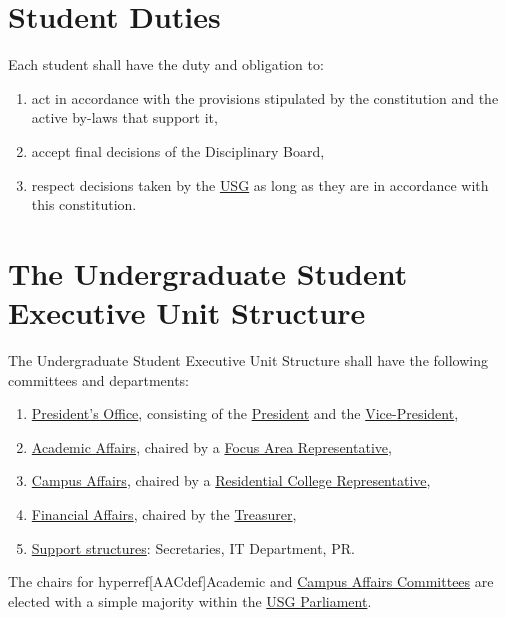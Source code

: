 \documentclass[12pt]{LaTeX_Misc/constitution}
\begin{document}
\section{Student Duties}
Each student shall have the duty and obligation to:
\begin{enumerate}
\item
act in accordance with the provisions stipulated by the constitution and the active by-laws that support it,

\item 
accept final decisions of the Disciplinary Board,

\item
 respect decisions taken by the \hyperref[USGdef]{USG} as long as they are in accordance with this constitution.
\end{enumerate}




\label{USGexecutiveUnitDef}


\section{The Undergraduate Student Executive Unit Structure} 
\label{USGstructure}
The Undergraduate Student Executive Unit Structure shall have the following committees and departments:
\begin{enumerate}
\item \hyperref[PresidentOfficeDef]{President's Office}, consisting of the \hyperref[PresDef]{President} and the \hyperref[VPdef]{Vice-President},
\item \hyperref[AACdef]{Academic Affairs}, chaired by a \hyperref[FARepDef]{Focus Area Representative},
\item \hyperref[CACdef]{Campus Affairs}, chaired by a \hyperref[CRepDef]{Residential College Representative},
\item \hyperref[Financesdef]{Financial Affairs}, chaired by the \hyperref[TreasurerDef]{Treasurer},
\item \hyperref[suppstrucdef]{Support structures}: Secretaries, IT Department, PR.
\end{enumerate}
The chairs for hyperref[AACdef]{Academic} and \hyperref[CACdef]{Campus Affairs Committees} are elected with a simple majority within the \hyperref[USGParliamentDef]{USG Parliament}.
\end{document}
